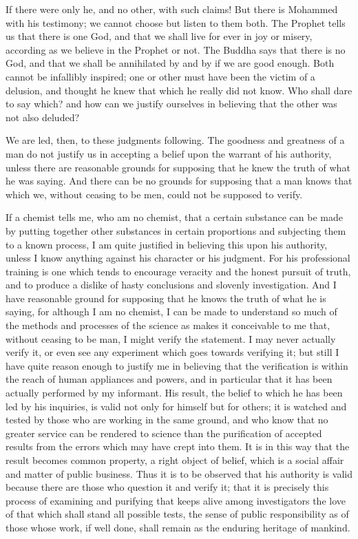 \documentclass[12pt]{article}
\begin{document}
If there were only he, and no other, with such claims! But there is Mohammed with his testimony; we cannot choose but listen to them both. The Prophet tells us that there is one God, and that we shall live for ever in joy or misery, according as we believe in the Prophet or not. The Buddha says that there is no God, and that we shall be annihilated by and by if we are good enough. Both cannot be infallibly inspired; one or other must have been the victim of a delusion, and thought he knew that which he really did not know. Who shall dare to say which? and how can we justify ourselves in believing that the other was not also deluded?

We are led, then, to these judgments following. The goodness and greatness of a man do not justify us in accepting a belief upon the warrant of his authority, unless there are reasonable grounds for supposing that he knew the truth of what he was saying. And there can be no grounds for supposing that a man knows that which we, without ceasing to be men, could not be supposed to verify.

If a chemist tells me, who am no chemist, that a certain substance can be made by putting together other substances in certain proportions and subjecting them to a known process, I am quite justified in believing this upon his authority, unless I know anything against his character or his judgment. For his professional training is one which tends to encourage veracity and the honest pursuit of truth, and to produce a dislike of hasty conclusions and slovenly investigation. And I have reasonable ground for supposing that he knows the truth of what he is saying, for although I am no chemist, I can be made to understand so much of the methods and processes of the science as makes it conceivable to me that, without ceasing to be man, I might verify the statement. I may never actually verify it, or even see any experiment which goes towards verifying it; but still I have quite reason enough to justify me in believing that the verification is within the reach of human appliances and powers, and in particular that it has been actually performed by my informant. His result, the belief to which he has been led by his inquiries, is valid not only for himself but for others; it is watched and tested by those who are working in the same ground, and who know that no greater service can be rendered to science than the purification of accepted results from the errors which may have crept into them. It is in this way that the result becomes common property, a right object of belief, which is a social affair and matter of public business. Thus it is to be observed that his authority is valid because there are those who question it and verify it; that it is precisely this process of examining and purifying that keeps alive among investigators the love of that which shall stand all possible tests, the sense of public responsibility as of those whose work, if well done, shall remain as the enduring heritage of mankind.
\end{document}
